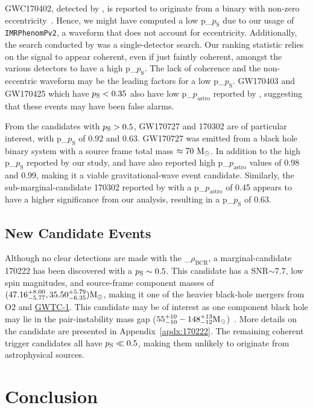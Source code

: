 \documentclass[%
 nofootinbib,
 amsmath,amssymb,
 aps,
 twocolumn,
 superscriptaddress
]{revtex4-2}
\newcommand{\imrphenomp}{{\sc \texttt{IMRPhenomPv2}}\xspace}
\newcommand{\GWTC}{{\sc \href{https://ui.adsabs.harvard.edu/abs/2019PhRvX...9c1040A/abstract}{{GWTC-1}}}\xspace}
\newcommand{\fancytext}[1]{{\relax\ifmmode#1\else $#1$\fi}\xspace}
\newcommand{\mathcmd}[1]{{\sc \relax\ifmmode#1\else $#1$\fi}\xspace}
\newcommand{\bcr}{\mathcmd{\rho_\text{BCR}}}
\newcommand{\msun}{\mathcmd{\text{M}_\odot}}
\newcommand{\pastro}{\fancytext{p_\text{astro}}}
\newcommand{\pastrobcr}{\fancytext{p_\text{S}}}
\begin{document}
GWC170402, detected by \citet{IAS2}, is reported to originate from a binary with non-zero eccentricity~\cite{IAS2}. Hence, we might have computed a low \pastrobcr due to our usage of \imrphenomp, a waveform that does not account for eccentricity. Additionally, the search conducted by \citet{IAS2} was a single-detector search. Our ranking statistic relies on the signal to appear coherent, even if just faintly coherent, amongst the various detectors to have a high \pastrobcr. The lack of coherence and the non-eccentric waveform may be the leading factors for a low \pastrobcr. GW170403 and GW170425 which have $\pastrobcr<0.35$ also have low  \pastro reported by \citet{pycbc_ogc_2},  suggesting that these events may have been false alarms.

From the candidates with $\pastrobcr>0.5$, GW170727 and 170302 are of particular interest, with \pastrobcr of $0.92$ and $0.63$. GW170727 was emitted from a black hole binary system with a source frame total mass $\approx 70\ \msun$. In addition to the high \pastrobcr reported by our study, \citet{IAS1} and \citet{pycbc_ogc_2} have also reported high \pastro values of 0.98 and 0.99, making it a viable gravitational-wave event candidate. Similarly, the sub-marginal-candidate 170302 reported by \cite{IAS1} with a \pastro of 0.45 appears to have a higher significance from our analysis, resulting in a \pastrobcr of $0.63$.  


\subsection{New Candidate Events}
Although no clear detections are made with the \bcr, a marginal-candidate 170222 has been discovered with a $\pastrobcr\sim0.5$. This candidate has a SNR$\sim7.7$, low spin magnitudes, and source-frame component masses of $({47.16}_{-5.77}^{+8.00}, {35.50}_{-6.35}^{+5.79}) \msun$, making it one of the heavier black-hole mergers from O2 and \GWTC. This candidate may be of interest as one component black hole may lie in the pair-instability mass gap ($55^{+10}_{-10}-148^{+13}_{-12}\msun$)~\cite{Woosley:2021:arXiv, Heger:2002:ApJ}. More details on the candidate are presented in Appendix~\ref{apdx:170222}. The remaining coherent trigger candidates all have $\pastrobcr\ll0.5$, making them unlikely to originate from astrophysical sources. 

\section{\label{sec:Conclusion}Conclusion}
\end{document}
